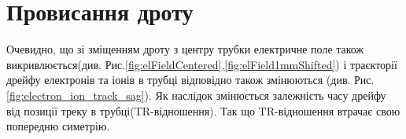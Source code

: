 \section{Провисання дроту}

	Очевидно, що зі зміщенням дроту з центру трубки електричне поле також викривлюється(див. Рис.\ref{fig:elFieldCentered},\ref{fig:elField1mmShifted}) і траєкторії дрейфу електронів та іонів в трубці відповідно також змінюються (див. Рис.\ref{fig:electron_ion_track_sag}). Як наслідок змінюється залежність часу дрейфу від позиції треку в трубці(TR-відношення). Так що TR-відношення втрачає свою попередню симетрію. 
	
	
